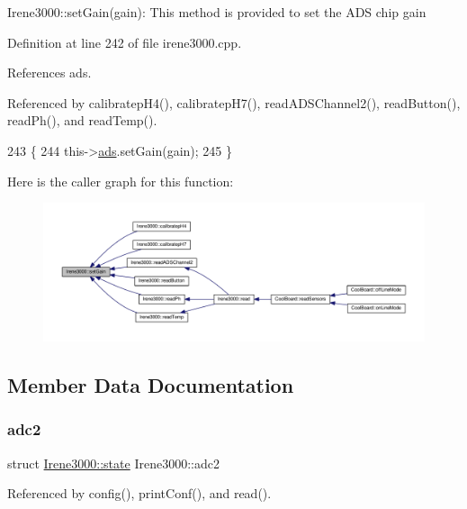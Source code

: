 Irene3000\+::set\+Gain(gain)\+: This method is provided to set the A\+DS chip gain 

Definition at line 242 of file irene3000.\+cpp.



References ads.



Referenced by calibratep\+H4(), calibratep\+H7(), read\+A\+D\+S\+Channel2(), read\+Button(), read\+Ph(), and read\+Temp().


\begin{DoxyCode}
243 \{
244     this->\hyperlink{classIrene3000_a1215e77ba761c9908d80d691f149e135}{ads}.setGain(gain);
245 \}
\end{DoxyCode}
Here is the caller graph for this function\+:
\nopagebreak
\begin{figure}[H]
\begin{center}
\leavevmode
\includegraphics[width=350pt]{classIrene3000_aff7c5da186b388e7272e63ff88a20c34_icgraph}
\end{center}
\end{figure}


\subsection{Member Data Documentation}
\mbox{\label{classIrene3000_aae3a95a1c83c766cd2f299ce471c337e}} 
\subsubsection{\texorpdfstring{adc2}{adc2}}
{\footnotesize\ttfamily struct \hyperlink{structIrene3000_1_1state}{Irene3000\+::state} Irene3000\+::adc2\hspace{0.3cm}{\ttfamily [private]}}



Referenced by config(), print\+Conf(), and read().

\mbox{\label{classIrene3000_a1215e77ba761c9908d80d691f149e135}} 
